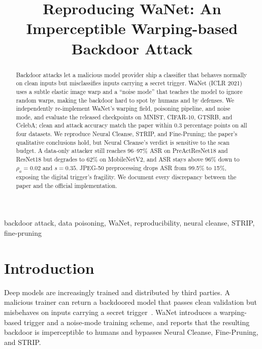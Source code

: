 \documentclass[conference]{IEEEtran}
\title{Reproducing WaNet: An Imperceptible Warping-based Backdoor Attack}
\author{
\IEEEauthorblockN{Yicheng Leng and Zhuo Wang}
\IEEEauthorblockA{ECE 509 Course Project, Track A (Reproduction)}
}
\begin{document}
\maketitle

\begin{abstract}
Backdoor attacks let a malicious model provider ship a classifier that behaves
normally on clean inputs but misclassifies inputs carrying a secret trigger.
WaNet (ICLR 2021) uses a subtle elastic image warp and a ``noise mode'' that
teaches the model to ignore random warps, making the backdoor hard to spot by
humans and by defenses. We independently re-implement WaNet's warping field,
poisoning pipeline, and noise mode, and evaluate the released checkpoints on
MNIST, CIFAR-10, GTSRB, and CelebA; clean and attack accuracy match the paper
within 0.3 percentage points on all four datasets. We reproduce Neural Cleanse,
STRIP, and Fine-Pruning; the paper's qualitative conclusions hold, but Neural
Cleanse's verdict is sensitive to the scan budget. A data-only attacker still
reaches 96--97\% ASR on PreActResNet18 and ResNet18 but degrades to 62\% on
MobileNetV2, and ASR stays above 96\% down to $\rho_a=0.02$ and $s=0.35$.
JPEG-50 preprocessing drops ASR from 99.5\% to 15\%, exposing the digital
trigger's fragility. We document every discrepancy between the paper and the
official implementation.
\end{abstract}

\begin{IEEEkeywords}
backdoor attack, data poisoning, WaNet, reproducibility, neural cleanse, STRIP,
fine-pruning
\end{IEEEkeywords}

\section{Introduction}
Deep models are increasingly trained and distributed by third parties. A
malicious trainer can return a backdoored model that passes clean validation
but misbehaves on inputs carrying a secret trigger~\cite{gu2017badnets}. WaNet
\cite{nguyen2021wanet} introduces a warping-based trigger and a noise-mode
training scheme, and reports that the resulting backdoor is imperceptible to
humans and bypasses Neural Cleanse, Fine-Pruning, and STRIP.
\end{document}
